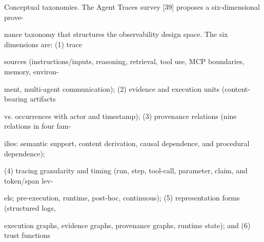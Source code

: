 \begin{flushleft}
\par\smallskip
\noindent Conceptual taxonomies. The Agent Traces survey [39] proposes a six-dimensional prove-\par
\noindent nance taxonomy that structures the observability design space. The six dimensions are: (1) trace\par
\noindent sources (instructions/inputs, reasoning, retrieval, tool use, MCP boundaries, memory, environ-\par
\noindent ment, multi-agent communication); (2) evidence and execution units (content-bearing artifacts\par
\noindent vs. occurrences with actor and timestamp); (3) provenance relations (nine relations in four fam-\par
\noindent ilies: semantic support, content derivation, causal dependence, and procedural dependence);\par
\noindent (4) tracing granularity and timing (run, step, tool-call, parameter, claim, and token/span lev-\par
\noindent els; pre-execution, runtime, post-hoc, continuous); (5) representation forms (structured logs,\par
\noindent execution graphs, evidence graphs, provenance graphs, runtime state); and (6) trust functions\par
\end{flushleft}
